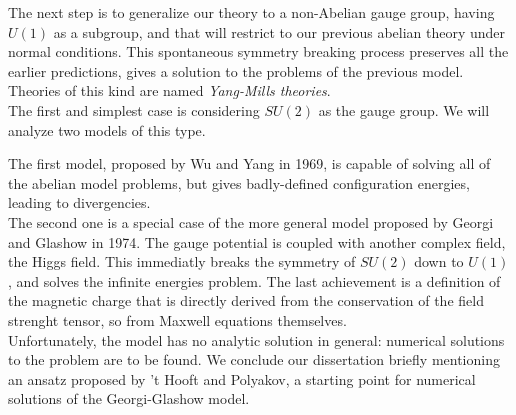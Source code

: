 The next step is to generalize our theory to a non-Abelian gauge group, having
$U(1)$ as a subgroup, and that will restrict to our previous abelian theory
under normal conditions.
This spontaneous symmetry breaking process preserves all the earlier predictions,
gives a solution to the problems of the previous model.\\
Theories of this kind are named \emph{Yang-Mills theories}.\\

The first and simplest case is considering $SU(2)$ as the gauge group. We will
analyze two models of this type.

The first model, proposed by Wu and Yang in 1969, is capable of solving all of
the abelian model problems, but gives badly-defined configuration energies, leading
to divergencies.\\
The second one is a special case of the more general model proposed by Georgi and
Glashow in 1974. The gauge potential is coupled with another complex field,
the Higgs field. This immediatly breaks the symmetry of $SU(2)$ down to $U(1)$,
and solves the infinite energies problem. The last achievement is a definition
of the magnetic charge that is directly derived from the conservation of the
field strenght tensor, so from Maxwell equations themselves.\\ 

Unfortunately, the model has no analytic solution in general: numerical
solutions to the problem are to be found.
We conclude our dissertation briefly mentioning an ansatz proposed
by 't Hooft and Polyakov, a starting point for numerical solutions of the Georgi-Glashow
model.

